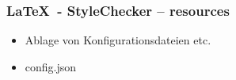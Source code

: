 \begin{frame}
\frametitle{\LaTeX~- StyleChecker -- resources}
\begin{block}{\vspace*{-3ex}}
	\begin{itemize}
	  	\item Ablage von Konfigurationsdateien etc.
		\item config.json
	\end{itemize}
\end{block}
\end{frame}